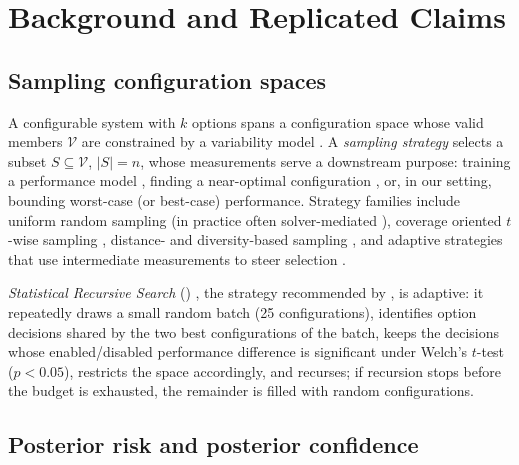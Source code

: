 \section{Background and Replicated Claims}
\label{sec:background}

\subsection{Sampling configuration spaces}

A configurable system with $k$ options spans a configuration space whose
valid members $\mathcal{V}$ are constrained by a variability model
\citep{apel2013feature}. A \emph{sampling strategy} selects a subset
$S \subseteq \mathcal{V}$, $|S| = n$, whose measurements serve a
downstream purpose: training a performance model
\citep{guo2013variability,siegmund2015performance,ha2019deepperf},
finding a near-optimal configuration \citep{oh2017srs,nair2020flash}, or,
in our setting, bounding worst-case (or best-case) performance. Strategy
families include uniform random sampling (in practice often
solver-mediated \citep{plazar2019uniform,heradio2022uniform}), coverage
oriented $t$-wise sampling \citep{medeiros2016comparison,baranov2024baital,hess2024unwise},
distance- and diversity-based sampling \citep{kaltenecker2019distance},
and adaptive strategies that use intermediate measurements to steer
selection \citep{sarkar2015cost,nair2017bad}.

\emph{Statistical Recursive Search} (\srs) \citep{oh2017srs}, the
strategy recommended by \citet{weis2026risk}, is adaptive: it repeatedly
draws a small random batch (25 configurations), identifies option
decisions shared by the two best configurations of the batch, keeps the
decisions whose enabled/disabled performance difference is significant
under Welch's $t$-test ($p<0.05$), restricts the space accordingly, and
recurses; if recursion stops before the budget is exhausted, the
remainder is filled with random configurations.

\subsection{Posterior risk and posterior confidence}
\label{sec:posterior}

